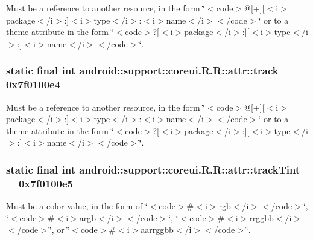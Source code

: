 Must be a reference to another resource, in the form \char`\"{}$<$code$>$@\mbox{[}+\mbox{]}\mbox{[}$<$i$>$package$<$/i$>$:\mbox{]}$<$i$>$type$<$/i$>$:$<$i$>$name$<$/i$>$$<$/code$>$\char`\"{} or to a theme attribute in the form \char`\"{}$<$code$>$?\mbox{[}$<$i$>$package$<$/i$>$:\mbox{]}\mbox{[}$<$i$>$type$<$/i$>$:\mbox{]}$<$i$>$name$<$/i$>$$<$/code$>$\char`\"{}. \hypertarget{classandroid_1_1support_1_1coreui_1_1_r_1_1attr_942cb85facf99f66dfbd43092ff4ce16}{
\subsubsection[{track}]{\setlength{\rightskip}{0pt plus 5cm}static final int android::support::coreui.R.R::attr::track = 0x7f0100e4}}
\label{classandroid_1_1support_1_1coreui_1_1_r_1_1attr_942cb85facf99f66dfbd43092ff4ce16}


Must be a reference to another resource, in the form \char`\"{}$<$code$>$@\mbox{[}+\mbox{]}\mbox{[}$<$i$>$package$<$/i$>$:\mbox{]}$<$i$>$type$<$/i$>$:$<$i$>$name$<$/i$>$$<$/code$>$\char`\"{} or to a theme attribute in the form \char`\"{}$<$code$>$?\mbox{[}$<$i$>$package$<$/i$>$:\mbox{]}\mbox{[}$<$i$>$type$<$/i$>$:\mbox{]}$<$i$>$name$<$/i$>$$<$/code$>$\char`\"{}. \hypertarget{classandroid_1_1support_1_1coreui_1_1_r_1_1attr_20f60bb356bcc82351c2b15589393c27}{
\subsubsection[{trackTint}]{\setlength{\rightskip}{0pt plus 5cm}static final int android::support::coreui.R.R::attr::trackTint = 0x7f0100e5}}
\label{classandroid_1_1support_1_1coreui_1_1_r_1_1attr_20f60bb356bcc82351c2b15589393c27}


Must be a \hyperlink{classandroid_1_1support_1_1coreui_1_1_r_1_1color}{color} value, in the form of \char`\"{}$<$code$>$\#$<$i$>$rgb$<$/i$>$$<$/code$>$\char`\"{}, \char`\"{}$<$code$>$\#$<$i$>$argb$<$/i$>$$<$/code$>$\char`\"{}, \char`\"{}$<$code$>$\#$<$i$>$rrggbb$<$/i$>$$<$/code$>$\char`\"{}, or \char`\"{}$<$code$>$\#$<$i$>$aarrggbb$<$/i$>$$<$/code$>$\char`\"{}. 


